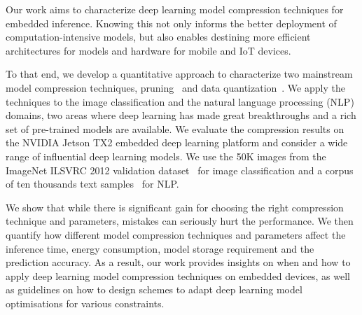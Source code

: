 Our work aims to characterize deep learning model compression techniques for embedded inference. Knowing this not only informs the better
deployment of computation-intensive models, but also enables destining more efficient architectures for models and hardware for mobile and
IoT devices.

To that end, we develop a quantitative approach  to characterize two mainstream model compression techniques, pruning~\cite{Cheng2017A} and
data quantization~\cite{Gong2014Compressing}. We apply the techniques to the image classification and the natural language processing (NLP)
domains, two areas where deep learning has made great breakthroughs and a rich set of pre-trained models are available. We evaluate the
compression results on the NVIDIA Jetson TX2 embedded deep learning platform and consider a wide range of influential deep learning models.
We use the 50K images from the ImageNet ILSVRC 2012 validation dataset~\cite{imagenet2012} for image classification and a corpus of ten
thousands text samples~\cite{acl2016} for NLP.


We show that while there is significant gain for choosing the right compression technique and parameters, mistakes can seriously hurt the
performance. We then quantify how different model compression techniques and parameters affect the inference time, energy consumption,
model storage requirement and the prediction accuracy. As a result, our work provides insights on when and how to apply deep learning model
compression techniques on embedded devices, as well as guidelines on how to design schemes to adapt deep learning model optimisations for
various constraints.

